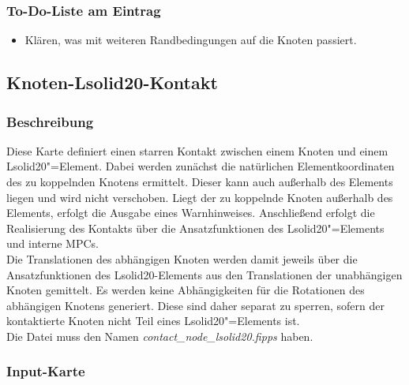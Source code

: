 \documentclass[11pt,titlepage,listof=totoc,bibliography=totoc,twoside]{scrreprt}
\begin{document}
{{\subsubsection{To-Do-Liste am Eintrag}

\begin{itemize}
\item Klären, was mit weiteren Randbedingungen auf die Knoten passiert.
\end{itemize}

\newpage

\subsection{Knoten-Lsolid20-Kontakt}

\subsubsection{Beschreibung}

Diese Karte definiert einen starren Kontakt zwischen einem Knoten und einem Lsolid20"=Element. Dabei werden zunächst die natürlichen Elementkoordinaten des zu koppelnden Knotens ermittelt. Dieser kann auch außerhalb des Elements liegen und wird nicht verschoben. Liegt der zu koppelnde Knoten außerhalb des Elements, erfolgt die Ausgabe eines Warnhinweises. Anschließend erfolgt die Realisierung des Kontakts über die Ansatzfunktionen des Lsolid20"=Elements und interne MPCs.\\
Die Translationen des abhängigen Knoten werden damit jeweils über die Ansatzfunktionen des Lsolid20-Elements aus den Translationen der unabhängigen Knoten gemittelt. Es werden keine Abhängigkeiten für die Rotationen des abhängigen Knotens generiert. Diese sind daher separat zu sperren, sofern der kontaktierte Knoten nicht Teil eines Lsolid20"=Elements ist.\\
Die Datei muss den Namen \emph{contact\_node\_lsolid20.fipps} haben.

\subsubsection{Input-Karte}

}}
\end{document}
